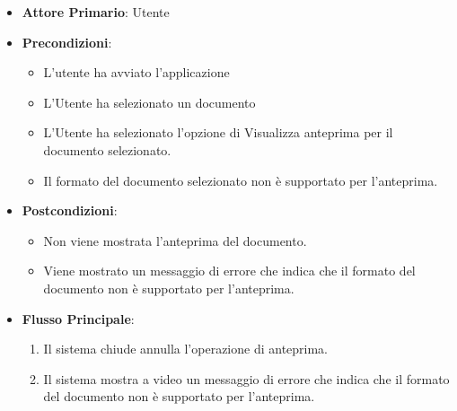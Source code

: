 \begin{itemize}
    \item \textbf{Attore Primario}: Utente
    \item \textbf{Precondizioni}: 
    \begin{itemize}
        \item L'utente ha avviato l'applicazione
        \item L'Utente ha selezionato un documento
        \item L'Utente ha selezionato l'opzione di Visualizza anteprima per il documento selezionato.
        \item Il formato del documento selezionato non è supportato per l'anteprima.
    \end{itemize}
    \item \textbf{Postcondizioni}: 
    \begin{itemize}
        \item Non viene mostrata l'anteprima del documento.
        \item Viene mostrato un messaggio di errore che indica che il formato del documento non è supportato per l'anteprima.
    \end{itemize}
    \item \textbf{Flusso Principale}:
    \begin{enumerate}
        \item Il sistema chiude annulla l'operazione di anteprima.
        \item Il sistema mostra a video un messaggio di errore che indica che il formato del documento non è supportato per l'anteprima.
    \end{enumerate}
\end{itemize}

